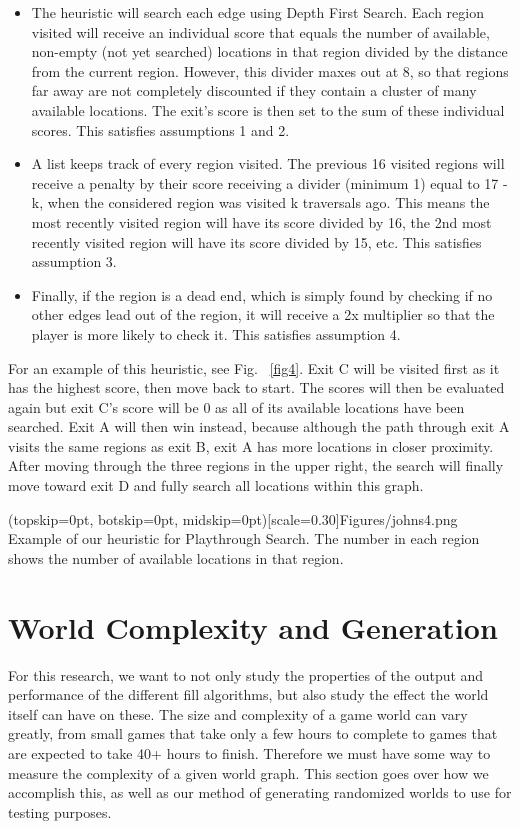 \documentclass{ieeeaccess}
\begin{document}
\begin{itemize}
    \item The heuristic will search each edge using Depth First Search. Each region visited
    will receive an individual score that equals the number of available, non-empty (not yet
    searched) locations in that region divided by the distance from the current region.
    However, this divider maxes out at 8, so that regions far away are not completely
    discounted if they contain a cluster of many available locations. The exit's score is then
    set to the sum of these individual scores. This satisfies assumptions 1 and 2.
    \item A list keeps track of every region visited. The previous 16 visited regions will 
    receive a penalty by their score receiving a divider (minimum 1) equal to 17 - k, when the
    considered region was visited k traversals ago. This means the most recently visited region
    will have its score divided by 16, the 2nd most recently visited region will have its score
    divided by 15, etc. This satisfies assumption 3.
    \item Finally, if the region is a dead end, which is simply found by checking if no other
    edges lead out of the region, it will receive a 2x multiplier so that the player is more
    likely to check it. This satisfies assumption 4.
\end{itemize}

For an example of this heuristic, see Fig. ~\ref{fig4}. Exit C will be visited first as it has the
highest score, then move back to start. The scores will then be evaluated again but exit C's
score will be 0 as all of its available locations have been searched. Exit A will then win
instead, because although the path through exit A visits the same regions as exit B, exit A has
more locations in closer proximity. After moving through the three regions in the upper right,
the search will finally move toward exit D and fully search all locations within this graph.

\Figure[t!](topskip=0pt, botskip=0pt, midskip=0pt)[scale=0.30]{Figures/johns4.png}
{Example of our heuristic for Playthrough Search. The number in each region shows the number of
available locations in that region.\label{fig4}}

\section{World Complexity and Generation}
For this research, we want to not only study the properties of the output and performance of
the different fill algorithms, but also study the effect the world itself can have on these.
The size and complexity of a game world can vary greatly, from small games that take only a few
hours to complete to games that are expected to take 40+ hours to finish. Therefore we must
have some way to measure the complexity of a given world graph. This section goes over how we
accomplish this, as well as our method of generating randomized worlds to use for testing
purposes.
\end{document}

